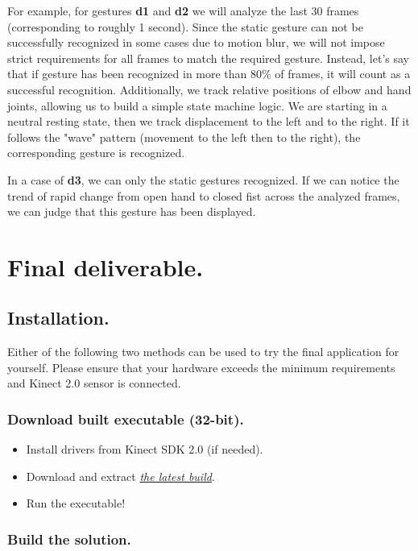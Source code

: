 \documentclass[a4paper,11pt,oneside]{article}
\begin{document}

For example, for gestures \textbf{d1} and \textbf{d2} we will analyze the last 30 frames (corresponding to roughly 1 second). Since the static gesture can not be successfully recognized in some cases due to motion blur, we will not impose strict requirements for all frames to match the required gesture. Instead, let's say that if gesture has been recognized in more than 80\% of frames, it will count as a successful recognition. Additionally, we track relative positions of elbow and hand joints, allowing us to build a simple state machine logic. We are starting in a neutral resting state, then we track displacement to the left and to the right. If it follows the "wave" pattern (movement to the left then to the right), the corresponding gesture is recognized.

In a case of \textbf{d3}, we can only the static gestures recognized. If we can notice the trend of rapid change from open hand to closed fist across the analyzed frames, we can judge that this gesture has been displayed. 

\section{Final deliverable.}

\subsection{Installation.}

Either of the following two methods can be used to try the final application for yourself. Please ensure that your hardware exceeds the minimum requirements and Kinect 2.0 sensor is connected.

\subsubsection{Download built executable (32-bit).}

\begin{itemize}
\item Install drivers from Kinect SDK 2.0 (if needed).
\item Download and extract \href{https://github.com/dmitryfd/KinectGR}{\textit{the latest build}}.
\item Run the executable!
\end{itemize}

\subsubsection{Build the solution.}
\end{document}
